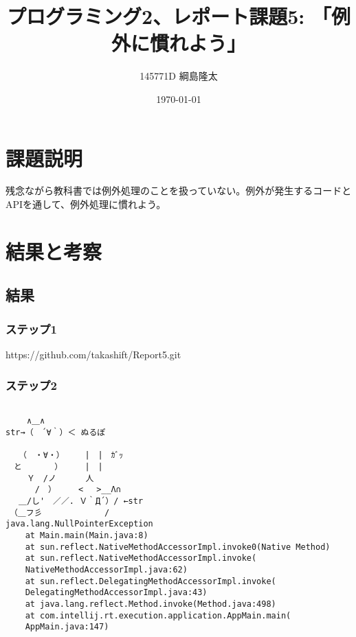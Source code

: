 \documentclass[12pt]{jsarticle}
\begin{document}
\title{プログラミング2、レポート課題5: 「例外に慣れよう」}
\date{\today}
\author{145771D 綱島隆太}
\maketitle

\section{課題説明}


残念ながら教科書では例外処理のことを扱っていない。例外が発生するコードとAPIを通して、例外処理に慣れよう。


\section{結果と考察}
\subsection{結果}
\subsubsection{ステップ1}
https://github.com/takashift/Report5.git

\subsubsection{ステップ2}

 \begin{shadebox}
\begin{verbatim}

　　 ∧＿∧
str→（　´∀｀）＜ ぬるぽ

　 （　・∀・）　　　|　|　ｶﾞｯ
　と　　　　）　 　 |　|
　　 Ｙ　/ノ　　　 人
　　　 /　）　 　 < 　>__Λ∩
　 ＿/し'　／／. Ｖ｀Д´）/ ←str
　（＿フ彡　　　　　 　　/
java.lang.NullPointerException
	at Main.main(Main.java:8)
	at sun.reflect.NativeMethodAccessorImpl.invoke0(Native Method)
	at sun.reflect.NativeMethodAccessorImpl.invoke(
	NativeMethodAccessorImpl.java:62)
	at sun.reflect.DelegatingMethodAccessorImpl.invoke(
	DelegatingMethodAccessorImpl.java:43)
	at java.lang.reflect.Method.invoke(Method.java:498)
	at com.intellij.rt.execution.application.AppMain.main(
	AppMain.java:147)

\end{verbatim}
\end{shadebox}
\vspace{10pt}
\end{document}
